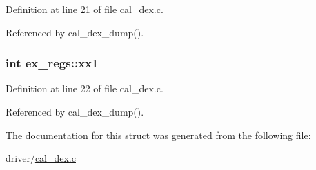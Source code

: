 Definition at line 21 of file cal\+\_\+dex.\+c.



Referenced by cal\+\_\+dex\+\_\+dump().

\subsubsection[{\texorpdfstring{xx1}{xx1}}]{\setlength{\rightskip}{0pt plus 5cm}int ex\+\_\+regs\+::xx1}\hypertarget{structex__regs_a12379b0b3152b878eebc8f18a6efeaf0}{}\label{structex__regs_a12379b0b3152b878eebc8f18a6efeaf0}


Definition at line 22 of file cal\+\_\+dex.\+c.



Referenced by cal\+\_\+dex\+\_\+dump().



The documentation for this struct was generated from the following file\+:\begin{DoxyCompactItemize}
\item 
driver/\hyperlink{cal__dex_8c}{cal\+\_\+dex.\+c}\end{DoxyCompactItemize}
